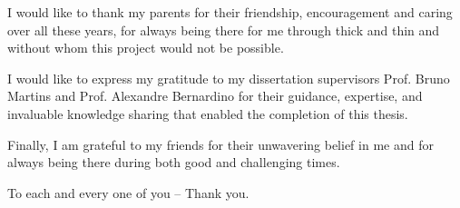 
I would like to thank my parents for their friendship, encouragement and caring over all these years, for always being there for me through thick and thin and without whom this project would not be possible.

I would like to express my gratitude to my dissertation supervisors Prof. Bruno Martins and Prof. Alexandre Bernardino for their guidance, expertise, and invaluable knowledge sharing that enabled the completion of this thesis.

Finally, I am grateful to my friends for their unwavering belief in me and for always being there during both good and challenging times.

To each and every one of you -- Thank you.